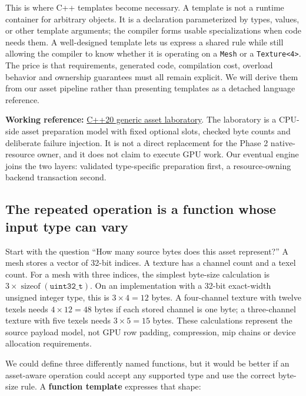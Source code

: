 This is where C++ templates become necessary. A template is not a runtime container for arbitrary objects. It is a declaration parameterized by types, values, or other template arguments; the compiler forms usable specializations when code needs them. A well-designed template lets us express a shared rule while still allowing the compiler to know whether it is operating on a \texttt{Mesh} or a \texttt{Texture\textless{}4\textgreater{}}. The price is that requirements, generated code, compilation cost, overload behavior and ownership guarantees must all remain explicit. We will derive them from our asset pipeline rather than presenting templates as a detached language reference.

\textbf{Working reference:} \hyperref[source-file-a5db53514d74ae247b4ac42f]{C++20 generic asset laboratory}. The laboratory is a CPU-side asset preparation model with fixed optional slots, checked byte counts and deliberate failure injection. It is not a direct replacement for the Phase 2 native-resource owner, and it does not claim to execute GPU work. Our eventual engine joins the two layers: validated type-specific preparation first, a resource-owning backend transaction second.

\subsection{The repeated operation is a function whose input type can vary}\label{01-foundations-i-ch005-the-repeated-operation-is-a-function-whose-input-type-can-vary}

Start with the question ``How many source bytes does this asset represent?'' A mesh stores a vector of 32-bit indices. A texture has a channel count and a texel count. For a mesh with three indices, the simplest byte-size calculation is \(3\times\operatorname{sizeof}(\texttt{uint32\_t})\). On an implementation with a 32-bit exact-width unsigned integer type, this is \(3\times4=12\) bytes. A four-channel texture with twelve texels needs \(4\times12=48\) bytes if each stored channel is one byte; a three-channel texture with five texels needs \(3\times5=15\) bytes. These calculations represent the source payload model, not GPU row padding, compression, mip chains or device allocation requirements.

We could define three differently named functions, but it would be better if an asset-aware operation could accept any supported type and use the correct byte-size rule. A \textbf{function template} expresses that shape:

